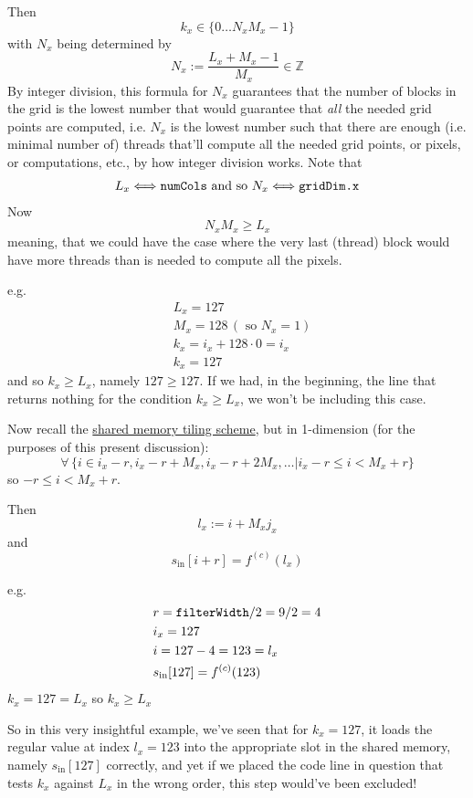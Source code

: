 \documentclass[10pt]{amsart}
\begin{document}
\begin{multicols*}{2}
Then
\[
k_x \in \lbrace 0 \dots N_xM_x -1 \rbrace
\]
with $N_x$ being determined by
\[
N_x := \frac{ L_x + M_x - 1 }{ M_x} \in \mathbb{Z}
\]
By integer division, this formula for $N_x$ guarantees that the number of blocks in the grid is the lowest number that would guarantee that \emph{all} the needed grid points are computed, i.e. $N_x$ is the lowest number such that there are enough (i.e. minimal number of) threads that'll compute all the needed grid points, or pixels, or computations, etc., by how integer division works.  Note that
\[
\begin{gathered}
  L_x \Longleftrightarrow \verb|numCols| \text{ and so }
  N_x \Longleftrightarrow \verb|gridDim.x|
\end{gathered}
\]
Now
\[
N_xM_x \geq L_x
\]
meaning, that we could have the case where the very last (thread) block would have more threads than is needed to compute all the pixels.  

e.g.\[
\begin{aligned}
  & L_x = 127 \\ 
  & M_x = 128 \, ( \text{ so } N_x = 1 ) \\ 
  & k_x = i_x + 128 \cdot 0 = i_x \\ 
  & k_x = 127 
  \end{aligned}
\]
and so $k_x \geq L_x$, namely $127 \geq 127$.  If we had, in the beginning, the line that returns nothing for the condition $k_x \geq L_x$, we won't be including this case.  

Now recall the \href{https://github.com/ernestyalumni/cs344/blob/master/Problem%20Sets/Problem%20Set%202/student_func.cu}{shared memory tiling scheme}, but in 1-dimension (for the purposes of this present discussion):
\[
\forall \, \lbrace i \in i_x - r, i_x - r + M_x , i_x -r + 2M_x, \dots | i_x - r \leq i < M_x + r \rbrace
\]
so $- r \leq i < M_x + r$.

Then
\[
l_x := i + M_xj_x 
\]
and
\[
s_{\text{in}}[i+r] = f^{(c)}(l_x)
\]

e.g.
\[
\begin{aligned}
  & r= \verb|filterWidth|/2 = 9/2 = 4 \\
  & i_x = 127 \\ 
  & i = 127 -4 = 123 = l_x \\
  & s_{\text{in}}[127] = f^{(c)}(123)
\end{aligned}
\]
$k_x=127 = L_x$ so $k_x \geq L_x$

So in this very insightful example, we've seen that for $k_x = 127$, it loads the regular value at index $l_x = 123$ into the appropriate slot in the shared memory, namely $s_{\text{in}}[127]$ correctly, and yet if we placed the code line in question that tests $k_x$ against $L_x$ in the wrong order, this step would've been excluded!  


\end{multicols*}
\end{document}
